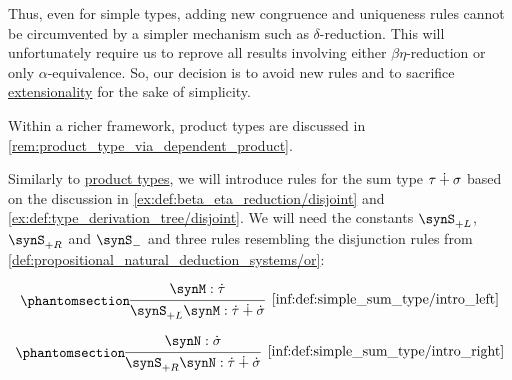 \begin{remark}
  Thus, even for simple types, adding new congruence and uniqueness rules cannot be circumvented by a simpler mechanism such as \( \delta \)-reduction. This will unfortunately require us to reprove all results involving either \( \beta\eta \)-reduction or only \( \alpha \)-equivalence. So, our decision is to avoid new rules and to sacrifice \hyperref[con:extensionality]{extensionality} for the sake of simplicity.
\end{remark}
\begin{comments}
  \item Within a richer framework, product types are discussed in \cref{rem:product_type_via_dependent_product}.
\end{comments}

\begin{definition}\label{def:simple_sum_type}\mimprovised
  Similarly to \hyperref[def:simple_product_type]{product types}, we will introduce rules for the sum type \( \tau \mathbin{\dotplus} \sigma \) based on the discussion in \cref{ex:def:beta_eta_reduction/disjoint} and \cref{ex:def:type_derivation_tree/disjoint}. We will need the constants \( \synS_{+L} \), \( \synS_{+R} \) and \( \synS_- \) and three rules resembling the disjunction rules from \cref{def:propositional_natural_deduction_systems/or}:
  \begin{paracol}{3}
    \begin{nthcolumn}{0}
      \ParacolAlignmentHack
      \begin{equation*}\taglabel[\ensuremath{ +_{+L} }]{inf:def:simple_sum_type/intro_left}
        \begin{prooftree}
          \hypo{ \synM: \syn\tau }
          \infer1[\ref{inf:def:simple_sum_type/intro_left}]{ \synS_{+L} \synM: \syn\tau \synplus \syn\sigma }
        \end{prooftree}
      \end{equation*}
    \end{nthcolumn}

    \begin{nthcolumn}{1}
      \ParacolAlignmentHack
      \begin{equation*}\taglabel[\ensuremath{ +_{+R} }]{inf:def:simple_sum_type/intro_right}
        \begin{prooftree}
          \hypo{ \synN: \syn\sigma }
          \infer1[\ref{inf:def:simple_sum_type/intro_right}]{ \synS_{+R} \synN: \syn\tau \synplus \syn\sigma }
        \end{prooftree}
      \end{equation*}
    \end{nthcolumn}


\end{paracol}
\end{definition}
